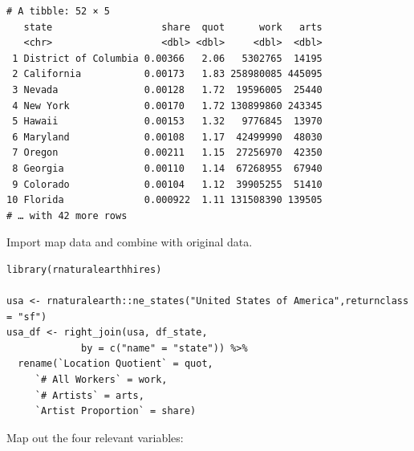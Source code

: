 \documentclass[8pt]{article}
\begin{document}
\begin{verbatim}
# A tibble: 52 × 5
   state                   share  quot      work   arts
   <chr>                   <dbl> <dbl>     <dbl>  <dbl>
 1 District of Columbia 0.00366   2.06   5302765  14195
 2 California           0.00173   1.83 258980085 445095
 3 Nevada               0.00128   1.72  19596005  25440
 4 New York             0.00170   1.72 130899860 243345
 5 Hawaii               0.00153   1.32   9776845  13970
 6 Maryland             0.00108   1.17  42499990  48030
 7 Oregon               0.00211   1.15  27256970  42350
 8 Georgia              0.00110   1.14  67268955  67940
 9 Colorado             0.00104   1.12  39905255  51410
10 Florida              0.000922  1.11 131508390 139505
# … with 42 more rows
\end{verbatim}

Import map data and combine with original data.
\begin{verbatim}
library(rnaturalearthhires)

usa <- rnaturalearth::ne_states("United States of America",returnclass = "sf")
usa_df <- right_join(usa, df_state,
		     by = c("name" = "state")) %>%
  rename(`Location Quotient` = quot,
	 `# All Workers` = work,
	 `# Artists` = arts,
	 `Artist Proportion` = share)
\end{verbatim}

Map out the four relevant variables:
\end{document}
